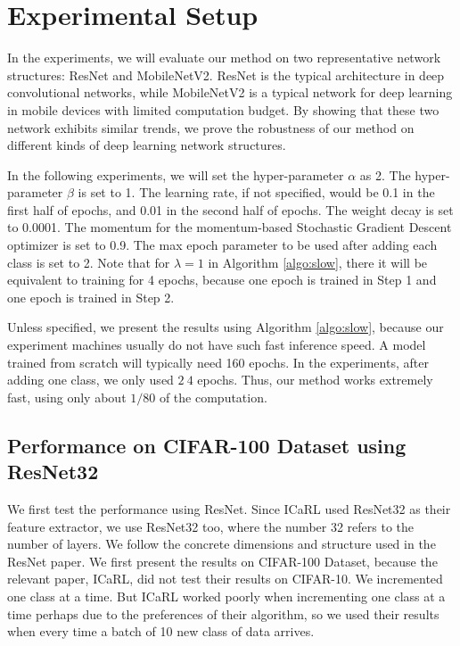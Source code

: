 \section{Experimental Setup}

In the experiments, we will evaluate our method on two representative network structures: ResNet and MobileNetV2. ResNet is the typical architecture in deep convolutional networks, while MobileNetV2 is a typical network for deep learning in mobile devices with limited computation budget. By showing that these two network exhibits similar trends, we prove the robustness of our method on different kinds of deep learning network structures. 

In the following experiments, we will set the hyper-parameter $\alpha$ as 2. The hyper-parameter $\beta$ is set to 1. The learning rate, if not specified, would be 0.1 in the first half of epochs, and 0.01 in the second half of epochs. The weight decay is set to 0.0001. The momentum for the momentum-based Stochastic Gradient Descent optimizer is set to 0.9. The max epoch parameter to be used after adding each class is set to 2. Note that for $\lambda=1$ in Algorithm \ref{algo:slow}, there it will be equivalent to training for 4 epochs, because one epoch is trained in Step 1 and one epoch is trained in Step 2.

Unless specified, we present the results using Algorithm \ref{algo:slow}, because our experiment machines usually do not have such fast inference speed. A model trained from scratch will typically need 160 epochs. In the experiments, after adding one class, we only used $2~4$ epochs. Thus, our method works extremely fast, using only about $1/80$ of the computation.

\subsection{Performance on CIFAR-100 Dataset using ResNet32}

We first test the performance using ResNet. Since ICaRL used ResNet32 as their feature extractor, we use ResNet32 too, where the number 32 refers to the number of layers. We follow the concrete dimensions and structure used in the ResNet paper\cite{he2016deep}. We first present the results on CIFAR-100 Dataset, because the relevant paper, ICaRL, did not test their results on CIFAR-10. We incremented one class at a time. But ICaRL worked poorly when incrementing one class at a time perhaps due to the preferences of their algorithm, so we used their results when every time a batch of 10 new class of data arrives. 


